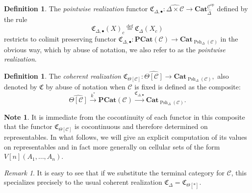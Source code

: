 \documentclass[a4paper]{article}
\numberwithin{equation}{subsection}
\theoremstyle{plain}   %
\theoremstyle{definition}
\newtheorem{defn}[equation]{Definition}
\newtheorem{note}[equation]{Note}
\theoremstyle{remark}
\newtheorem{rem}[equation]{Remark}
\theoremstyle{plain}
\newcommand{\op}{\ensuremath{\mathrm{op}}}
\newcommand{\Cat}{\ensuremath{\mathbf{Cat}}}
\newcommand{\psh}[1]{\ensuremath{\widehat{#1}}}
\providecommand{\C}{}
\renewcommand{\C}{\ensuremath{\mathcal{C}}}
\newcommand{\defeq}{\overset{\mathrm{def}}=}
\newcommand{\cellset}{\ensuremath{\widehat{\Theta[\mathcal{C}]}}}
\newcommand{\spsh}{\ensuremath{\operatorname{Psh}_\Delta(\mathcal{C})}}
\begin{document}
\begin{defn}\label{pointwisedefn}
	The \emph{pointwise realization} functor \(\mathfrak{C}_{\Delta,\bullet}: \psh{\Delta\times\C} \to \Cat_{\psh{\Delta}}^{\C^\op}\) defined by the rule 
	\[
		\mathfrak{C}_{\Delta,\bullet}(X)_c \defeq \mathfrak{C}_{\Delta}(X_c)
	\]
		restricts to colimit preserving functor \(\mathfrak{C}_{\Delta,\bullet}: \mathbf{PCat}(\C) \to \Cat_{\spsh}\) in the obvious way, which by abuse of notation, we also refer to as the \emph{pointwise realization}.
\end{defn}

\begin{defn}
	The \emph{coherent realization} \(\mathfrak{C}_{\Theta[\C]}:\cellset \to \Cat_{\spsh},\) also denoted by \(\mathfrak{C}\) by abuse of notation when \(\C\) is fixed is defined as the composite: 
	\[
		\cellset \xrightarrow{k^\ast} \mathbf{PCat}(\C) \xrightarrow{\mathfrak{C}_{\Delta,\bullet}} \Cat_{\spsh}.
	\] 
\end{defn}
\begin{note}
	It is immediate from the cocontinuity of each functor in this composite that the functor \(\mathfrak{C}_{\Theta[\C]}\) is cocontinuous and therefore determined on representables. In what follows, we will give an explicit computation of its values on representables and in fact more generally on cellular sets of the form \(V[n](A_1,\dots,A_n)\).
\end{note}
\begin{rem}
	It is easy to see that if we substitute the terminal category for \(\C\), this specializes precisely to the usual coherent realization \(\mathfrak{C}_{\Delta} = \mathfrak{C}_{\Theta[\ast]}\).  
\end{rem}
\end{document}
